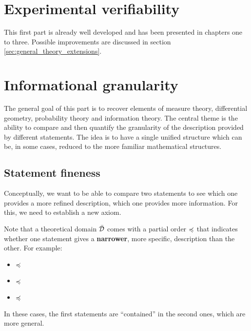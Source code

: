 \documentclass[11pt,letterpaper,fleqn]{memoir} %
\begin{document}
\section{Experimental verifiability}

This first part is already well developed and has been presented in chapters one to three. Possible improvements are discussed in section \ref{sec:general_theory_extensions}.


\section{Informational granularity}

The general goal of this part is to recover elements of measure theory, differential geometry, probability theory and information theory. The central theme is the ability to compare and then quantify the granularity of the description provided by different statements. The idea is to have a single unified structure which can be, in some cases, reduced to the more familiar mathematical structures.

\subsection{Statement fineness}

Conceptually, we want to be able to compare two statements to see which one provides a more refined description, which one provides more information. For this, we need to establish a new axiom.

Note that a theoretical domain $\bar{\mathcal{D}}$ comes with a partial order $\preccurlyeq$ that indicates whether one statement gives a \textbf{narrower}, more specific, description than the other. For example:
\begin{itemize}
	\item {} $\preccurlyeq$ 
	\item {} $\preccurlyeq$ 
	\item {} $\preccurlyeq$ 
\end{itemize}
In these cases, the first statements are ``contained'' in the second ones, which are more general.
\end{document}
